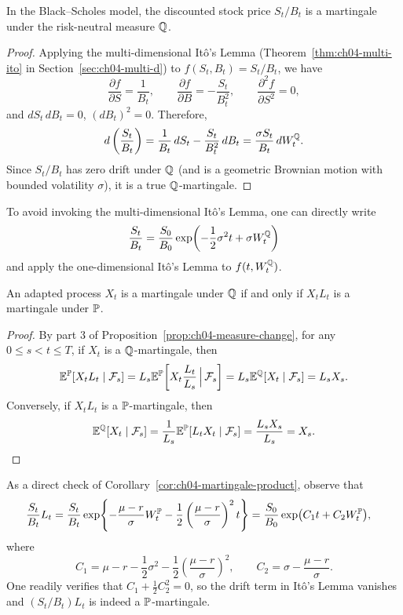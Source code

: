 \begin{lemma}
    \label{lem:ch04-discounted-martingale}
    In the Black--Scholes model, the discounted stock price $S_t/B_t$ is a martingale under the risk-neutral measure $\mathbb{Q}$.
\end{lemma}
\begin{proof}
    Applying the multi-dimensional It\^o's Lemma (Theorem~\ref{thm:ch04-multi-ito} in Section~\ref{sec:ch04-multi-d}) to $f(S_t, B_t) = S_t / B_t$, we have
    \[
        \frac{\partial f}{\partial S} = \frac{1}{B_t}, \qquad
        \frac{\partial f}{\partial B} = -\frac{S_t}{B_t^2}, \qquad
        \frac{\partial^2 f}{\partial S^2} = 0,
    \]
    and $dS_t\,dB_t = 0$, $(dB_t)^2 = 0$. Therefore,
    \[
        d\left(\frac{S_t}{B_t}\right)
        = \frac{1}{B_t}\,dS_t - \frac{S_t}{B_t^2}\,dB_t
        = \frac{\sigma S_t}{B_t}\,dW_t^{\mathbb{Q}}.
    \]
    Since $S_t/B_t$ has zero drift under $\mathbb{Q}$ (and is a geometric Brownian motion with bounded volatility $\sigma$), it is a true $\mathbb{Q}$-martingale.
\end{proof}

\begin{note}
    To avoid invoking the multi-dimensional It\^o's Lemma, one can directly write
    \[
        \frac{S_t}{B_t} = \frac{S_0}{B_0}\exp\!\left(-\frac{1}{2}\sigma^2 t + \sigma W_t^{\mathbb{Q}}\right)
    \]
    and apply the one-dimensional It\^o's Lemma to $f(t, W_t^{\mathbb{Q}})$.
\end{note}

\begin{corollary}
    \label{cor:ch04-martingale-product}
    An adapted process $X_t$ is a martingale under $\mathbb{Q}$ if and only if $X_t L_t$ is a martingale under $\mathbb{P}$.
\end{corollary}
\begin{proof}
    By part 3 of Proposition~\ref{prop:ch04-measure-change}, for any $0 \le s < t \le T$, if $X_t$ is a $\mathbb{Q}$-martingale, then
    \[
        \mathbb{E}^{\mathbb{P}}[X_t L_t \mid \mathcal{F}_s]
        = L_s \mathbb{E}^{\mathbb{P}}\!\left[X_t \frac{L_t}{L_s} \,\Big|\, \mathcal{F}_s\right]
        = L_s \mathbb{E}^{\mathbb{Q}}[X_t \mid \mathcal{F}_s]
        = L_s X_s.
    \]
    Conversely, if $X_t L_t$ is a $\mathbb{P}$-martingale, then
    \[
        \mathbb{E}^{\mathbb{Q}}[X_t \mid \mathcal{F}_s]
        = \frac{1}{L_s}\mathbb{E}^{\mathbb{P}}[L_t X_t \mid \mathcal{F}_s]
        = \frac{L_s X_s}{L_s} = X_s. \qedhere
    \]
\end{proof}

\begin{note}
    As a direct check of Corollary~\ref{cor:ch04-martingale-product}, observe that
    \begin{align*}
        \frac{S_t}{B_t} L_t
        &= \frac{S_t}{B_t}\exp\!\left\{-\frac{\mu - r}{\sigma} W_t^{\mathbb{P}} - \frac{1}{2}\left(\frac{\mu - r}{\sigma}\right)^2 t\right\}
        = \frac{S_0}{B_0}\exp\bigl(C_1 t + C_2 W_t^{\mathbb{P}}\bigr),
    \end{align*}
    where
    \[
        C_1 = \mu - r - \frac{1}{2}\sigma^2 - \frac{1}{2}\left(\frac{\mu - r}{\sigma}\right)^2, \qquad
        C_2 = \sigma - \frac{\mu - r}{\sigma}.
    \]
    One readily verifies that $C_1 + \frac{1}{2}C_2^2 = 0$, so the drift term in It\^o's Lemma vanishes and $(S_t/B_t) L_t$ is indeed a $\mathbb{P}$-martingale.
\end{note}

